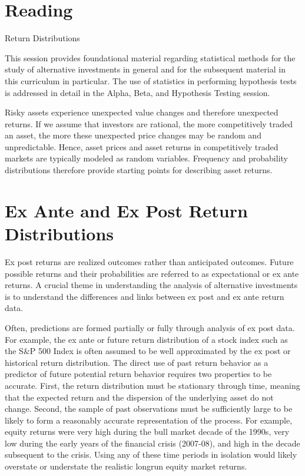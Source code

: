 \documentclass[11pt]{article}
\begin{document}
\section*{Reading}
Return Distributions

This session provides foundational material regarding statistical methods for the study of alternative investments in general and for the subsequent material in this curriculum in particular. The use of statistics in performing hypothesis tests is addressed in detail in the Alpha, Beta, and Hypothesis Testing session.

Risky assets experience unexpected value changes and therefore unexpected returns. If we assume that investors are rational, the more competitively traded an asset, the more these unexpected price changes may be random and unpredictable. Hence, asset prices and asset returns in competitively traded markets are typically modeled as random variables. Frequency and probability distributions therefore provide starting points for describing asset returns.

\section*{Ex Ante and Ex Post Return Distributions}
Ex post returns are realized outcomes rather than anticipated outcomes. Future possible returns and their probabilities are referred to as expectational or ex ante returns. A crucial theme in understanding the analysis of alternative investments is to understand the differences and links between ex post and ex ante return data.

Often, predictions are formed partially or fully through analysis of ex post data. For example, the ex ante or future return distribution of a stock index such as the S\&P 500 Index is often assumed to be well approximated by the ex post or historical return distribution. The direct use of past return behavior as a predictor of future potential return behavior requires two properties to be accurate. First, the return distribution must be stationary through time, meaning that the expected return and the dispersion of the underlying asset do not change. Second, the sample of past observations must be sufficiently large to be likely to form a reasonably accurate representation of the process. For example, equity returns were very high during the bull market decade of the 1990s, very low during the early years of the financial crisis (2007-08), and high in the decade subsequent to the crisis. Using any of these time periods in isolation would likely overstate or understate the realistic longrun equity market returns.
\end{document}
